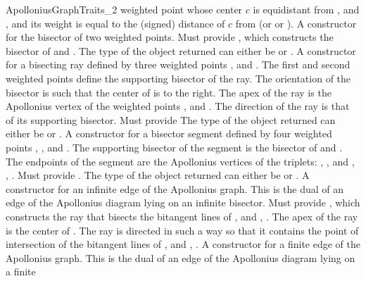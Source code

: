 \begin{ccRefConcept}{ApolloniusGraphTraits_2}
{weighted point whose center $c$ is equidistant from ,  and
, and its weight is equal to the (signed) distance of $c$
from  (or  or ).}
%
\ccGlue
{}
{A constructor for the bisector of
two weighted points. Must provide , which constructs
the bisector of  and . The type of the object returned
can either be  or .}
%
\ccGlue
{}
{A constructor for a bisecting
ray defined by three weighted points ,  and . 
The first and second weighted points define the supporting bisector of
the ray. The orientation of the bisector is such that the center of
 is to the right. The apex of the ray is the Apollonius vertex
of the weighted points ,  and . The direction
of the ray is that of its supporting bisector.
Must provide 
The type of the object returned can either be  or
.}
%
\ccGlue
{}
{A constructor for a bisector segment defined by four weighted
points , ,  and . The supporting
bisector of the segment is the bisector of  and . The
endpoints of the segment are the Apollonius vertices of the triplets:
, ,  and , , .
Must provide .
The type of the object returned can either be  or
.}
%
\ccGlue
{}
{A constructor for an infinite edge of the Apollonius graph. This is
the dual of an edge of the Apollonius diagram lying on an infinite
bisector. Must provide , which constructs the
ray that bisects the bitangent lines of ,  and
, . The apex of the ray is the center of . The 
ray is directed in such a way so that it contains the point of
intersection of the bitangent lines of ,  and 
, .}
%
\ccGlue
{}
{A constructor for a finite edge of the Apollonius graph. This is the
dual of an edge of the Apollonius diagram lying on a finite
}
\end{ccRefConcept}
